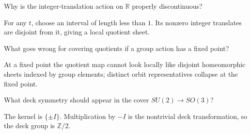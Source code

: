 \begin{problem}\label{prob:viii12-22}
Why is the integer-translation action on \(\mathbb R\) properly discontinuous?
\end{problem}
\begin{solution}
For any \(t\), choose an interval of length less than \(1\). Its nonzero integer translates are disjoint from it, giving a local quotient sheet.
\end{solution}

\begin{problem}\label{prob:viii12-23}
What goes wrong for covering quotients if a group action has a fixed point?
\end{problem}
\begin{solution}
At a fixed point the quotient map cannot look locally like disjoint homeomorphic sheets indexed by group elements; distinct orbit representatives collapse at the fixed point.
\end{solution}

\begin{problem}[Bridge to \(SU(2)\)]\label{prob:viii12-24}
What deck symmetry should appear in the cover \(SU(2)\to SO(3)\)?
\end{problem}
\begin{solution}
The kernel is \(\{\pm I\}\).  Multiplication by \(-I\) is the nontrivial deck transformation, so the deck group is \(\mathbb Z/2\).
\end{solution}
